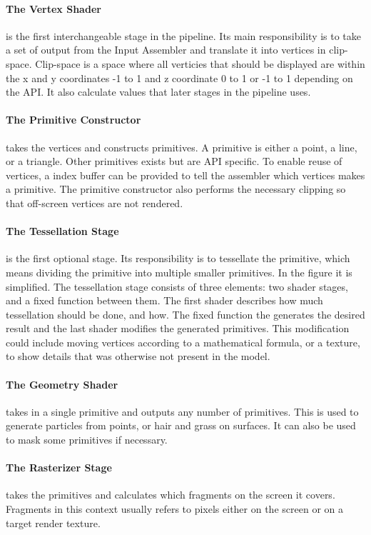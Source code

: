 \paragraph{The Vertex Shader} is the first interchangeable stage in the pipeline.
Its main responsibility is to take a set of output from the Input Assembler and translate it into vertices in clip-space.
Clip-space is a space where all verticies that should be displayed are within the x and y coordinates -1 to 1 and z coordinate 0 to 1 or -1 to 1 depending on the \gls{API}.
It also calculate values that later stages in the pipeline uses.

\paragraph{The Primitive Constructor} takes the vertices and constructs primitives.
A primitive is either a point, a line, or a triangle.
Other primitives exists but are \gls{API} specific.
To enable reuse of vertices, a index buffer can be provided to tell the assembler which vertices makes a primitive.
The primitive constructor also performs the necessary clipping so that off-screen vertices are not rendered.

\paragraph{The Tessellation Stage} is the first optional stage.
Its responsibility is to tessellate the primitive, which means dividing the primitive into multiple smaller primitives.
In the figure it is simplified.
The tessellation stage consists of three elements: two shader stages, and a fixed function between them.
The first shader describes how much tessellation should be done, and how.
The fixed function the generates the desired result and the last shader modifies the generated primitives.
This modification could include moving vertices according to a mathematical formula, or a texture, to show details that was otherwise not present in the model.

\paragraph{The Geometry Shader} takes in a single primitive and outputs any number of primitives.
This is used to generate particles from points, or hair and grass on surfaces.
It can also be used to mask some primitives if necessary.


\paragraph{The Rasterizer Stage} takes the primitives and calculates which fragments on the screen it covers.
Fragments in this context usually refers to pixels either on the screen or on a target render texture.

